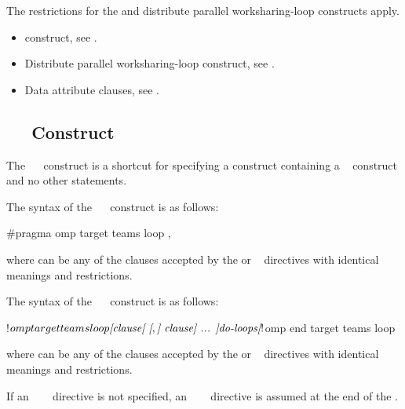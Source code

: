 \restrictions
The restrictions for the  and distribute parallel worksharing-loop 
constructs apply.

\crossreferences
\begin{itemize}
\item {} construct, see
.

\item Distribute parallel worksharing-loop construct, see
.

\item Data attribute clauses, see
.
\end{itemize}



\subsection{~~ Construct}
\label{subsec:target teams loop}
\summary
The ~~ construct is a shortcut for specifying a 
 construct containing a ~ construct and no other 
statements.

\syntax
\begin{ccppspecific}
The syntax of the ~~ construct is as follows:

\begin{ompcPragma}[fontsize=\small]
#pragma omp target teams loop \plc{[clause[ [},\plc{] clause] ... ] new-line}
\end{ompcPragma}

where  can be any of the clauses accepted by the  or
~ directives with identical meanings and restrictions.
\end{ccppspecific}

\begin{fortranspecific}
The syntax of the ~~ construct is as follows:

\begin{ompfPragma}
!$omp target teams loop \plc{[clause[ [},\plc{] clause] ... ]}
    \plc{do-loops}
\plc{[}!$omp end target teams loop\plc{]}
\end{ompfPragma}

where  can be any of the clauses accepted by the  or
~ directives with identical meanings and restrictions.

If an ~~~ directive is not 
specified, an ~~~ directive 
is assumed at the end of the .
\end{fortranspecific}

